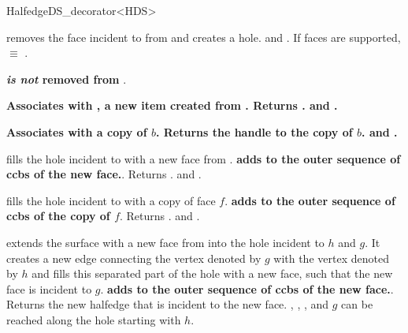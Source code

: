 \begin{ccRefClass}{HalfedgeDS_decorator<HDS>}


   {removes the face incident to  from  and creates a hole.
    \ccPrecond {} and . 
     If faces are supported,  
     $\equiv$ .
    
    {\bf\ttfamily {}  {\em is not} removed from }.
   }

   {\bf\ttfamily Associates  with , a new  item created from .
    Returns .
    \ccPrecond {} and .}

   {\bf\ttfamily Associates  with a copy of $b$.
    Returns the handle to the copy of $b$.
    \ccPrecond {} and .}

   {fills the hole incident to  with a new face from .
   {\bf\ttfamily adds  to the outer sequence of ccbs of the new face.}.
    Returns .
    \ccPrecond {} and .}

   {fills the hole incident to  with a copy of face $f$.
   {\bf\ttfamily adds  to the outer sequence of ccbs of the copy of $f$}.
    Returns .
    \ccPrecond {} and .}

   {extends the surface with a new face from  into the hole 
    incident to $h$ and $g$. It creates a new edge connecting the vertex
    denoted by $g$ with the vertex denoted by $h$ and fills this separated 
    part of the hole with a new face, such that the new face is incident 
    to $g$. 
    {\bf\ttfamily adds  to the outer sequence of ccbs of the new face.}.
    Returns the new halfedge that is incident to the new face.
    \ccPrecond {}, ,
    ,  and $g$ can be reached 
    along the hole starting with $h$.}


\end{ccRefClass}
